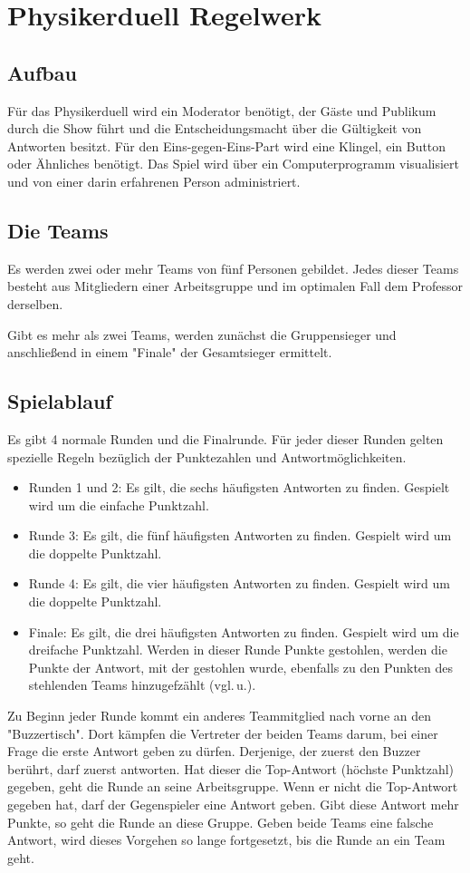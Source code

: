 \documentclass[a4paper, 12pt, pagesize, headlines=2.1, headsepline, german, ngerman]{scrartcl}
\begin{document}
\section*{Physikerduell Regelwerk}

\subsection*{Aufbau}
Für das Physikerduell wird ein Moderator benötigt, der Gäste und Publikum durch die Show führt und die Entscheidungsmacht über die Gültigkeit von Antworten besitzt. Für den Eins-gegen-Eins-Part wird eine Klingel, ein Button oder Ähnliches benötigt. Das Spiel wird über ein Computerprogramm visualisiert und von einer darin erfahrenen Person administriert.

\subsection*{Die Teams}
Es werden zwei oder mehr Teams von fünf Personen gebildet. Jedes dieser Teams besteht aus Mitgliedern einer Arbeitsgruppe und im optimalen Fall dem Professor derselben.

Gibt es mehr als zwei Teams, werden zunächst die Gruppensieger und anschließend in einem "Finale" der Gesamtsieger ermittelt.

\subsection*{Spielablauf}
Es gibt 4 normale Runden und die Finalrunde. Für jeder dieser Runden gelten spezielle Regeln bezüglich der Punktezahlen und Antwortmöglichkeiten.
\begin{itemize}
	\item Runden 1 und 2: Es gilt, die sechs häufigsten Antworten zu finden. Gespielt wird um die einfache Punktzahl.
	\item Runde 3: Es gilt, die fünf häufigsten Antworten zu finden. Gespielt wird um die doppelte Punktzahl.
	\item Runde 4: Es gilt, die vier häufigsten Antworten zu finden. Gespielt wird um die doppelte Punktzahl.
	\item Finale: Es gilt, die drei häufigsten Antworten zu finden. Gespielt wird um die dreifache Punktzahl. Werden in dieser Runde Punkte gestohlen, werden die Punkte der Antwort, mit der gestohlen wurde, ebenfalls zu den Punkten des stehlenden Teams hinzugefzählt (vgl.\,u.).
\end{itemize}
Zu Beginn jeder Runde kommt ein anderes Teammitglied nach vorne an den "Buzzertisch". Dort kämpfen die Vertreter der beiden Teams darum, bei einer Frage die erste Antwort geben zu dürfen. Derjenige, der zuerst den Buzzer berührt, darf zuerst antworten. Hat dieser die Top-Antwort (höchste Punktzahl) gegeben, geht die Runde an seine Arbeitsgruppe. Wenn er nicht die Top-Antwort gegeben hat, darf der Gegenspieler eine Antwort geben. Gibt diese Antwort mehr Punkte, so geht die Runde an diese Gruppe. Geben beide Teams eine falsche Antwort, wird dieses Vorgehen so lange fortgesetzt, bis die Runde an ein Team geht.
\end{document}
